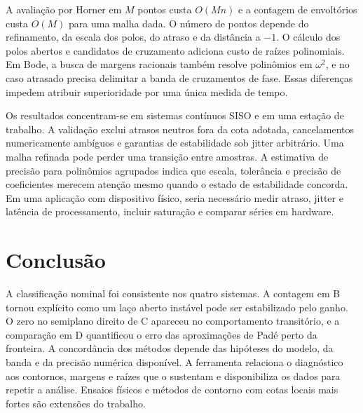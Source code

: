 A avaliação por Horner em $M$ pontos custa $O(Mn)$ e a
contagem de envoltórios custa $O(M)$ para uma malha dada.
O número de pontos depende do refinamento, da escala dos
polos, do atraso e da distância a $-1$. O cálculo dos polos
abertos e candidatos de cruzamento adiciona custo de raízes
polinomiais. Em Bode, a busca de margens racionais também
resolve polinômios em $\omega^2$, e no caso atrasado precisa
delimitar a banda de cruzamentos de fase. Essas diferenças
impedem atribuir superioridade por uma única medida de tempo.

Os resultados concentram-se em sistemas contínuos SISO e
em uma estação de trabalho. A validação exclui atrasos
neutros fora da cota adotada, cancelamentos numericamente
ambíguos e garantias de estabilidade sob jitter arbitrário.
Uma malha refinada pode perder uma transição entre amostras.
A estimativa de precisão para polinômios agrupados indica
que escala, tolerância e precisão de coeficientes merecem
atenção mesmo quando o estado de estabilidade concorda.
Em uma aplicação com dispositivo físico, seria necessário
medir atraso, jitter e latência de processamento, incluir
saturação e comparar séries em hardware.

\section{Conclusão}
A classificação nominal foi consistente nos quatro sistemas.
A contagem em B tornou explícito como um laço aberto
instável pode ser estabilizado pelo ganho. O zero no
semiplano direito de C apareceu no comportamento transitório,
e a comparação em D quantificou o erro das aproximações de
Padé perto da fronteira. A concordância dos métodos depende
das hipóteses do modelo, da banda e da precisão numérica
disponível. A ferramenta relaciona o diagnóstico aos
contornos, margens e raízes que o sustentam e disponibiliza
os dados para repetir a análise. Ensaios físicos e métodos
de contorno com cotas locais mais fortes são extensões do
trabalho.

